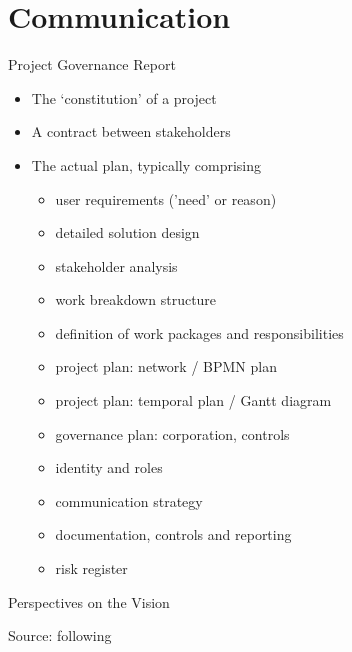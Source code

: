 \section{Communication}


\begin{frame}{Project Governance Report}
    \begin{itemize}
        \item The `constitution' of a project
        \item A contract between stakeholders
        \item The actual plan, typically comprising
        \begin{itemize}
            \item user requirements ('need' or reason)
            \item detailed solution design
            \item stakeholder analysis
            \item work breakdown structure 
            \item definition of work packages and responsibilities
            \item project plan: network / BPMN plan
            \item project plan: temporal plan / Gantt diagram
            \item governance plan: corporation, controls
            \item identity and roles
            \item communication strategy 
            \item documentation, controls and reporting
            \item risk register
        \end{itemize}
    \end{itemize}
\end{frame}



\newcommand{\mybox}[1]{\fbox{\parbox[t]{2.5cm}{#1}}}
\begin{frame}{Perspectives on the Vision}  %

    
    
 
    \vfill
    Source: following \cite[p.113]{Roberts}
\end{frame}

